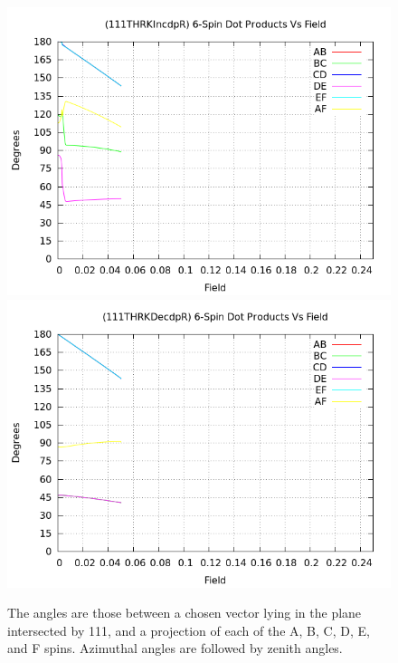 \documentclass{article}
\begin{document}
\begin{figure}
\centering
\includegraphics[scale=0.27]{HVariedData/Pictures/111THRKIncdpR.png}
\includegraphics[scale=0.27]{HVariedData/Pictures/111THRKDecdpR.png}
\caption{The angles are those between a chosen vector lying in the plane intersected by 111,
and a projection of each of the A, B, C, D, E, and F  spins. Azimuthal angles are followed by zenith angles.}
\end{figure}
\clearpage
\end{document}
